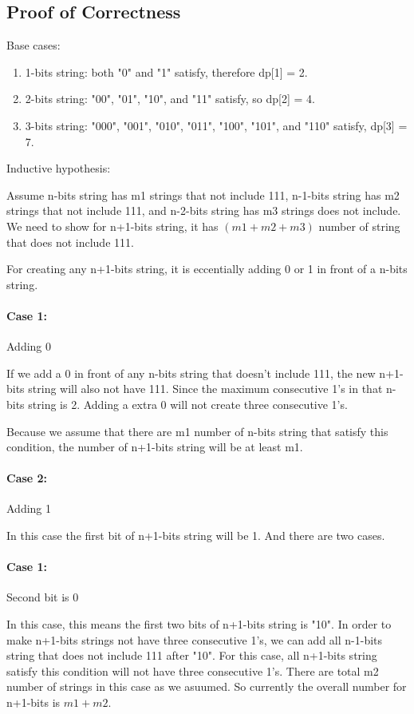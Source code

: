 \documentclass{article}
\begin{document}
\subsection*{Proof of Correctness}
Base cases:
\begin{enumerate}
    \item 1-bits string: both "0" and "1" satisfy, therefore dp[1] = 2.
    \item 2-bits string: "00", "01", "10", and "11" satisfy, so dp[2] = 4.
    \item 3-bits string: "000", "001", "010", "011", "100", "101", and "110" satisfy, dp[3] = 7.
\end{enumerate}
Inductive hypothesis:

Assume n-bits string has m1 strings that not include 111, n-1-bits string has m2 strings that not include 111, and n-2-bits string has m3 strings does not include.
We need to show for n+1-bits string, it has $(m1+m2+m3)$ number of string that does not include 111.

For creating any n+1-bits string, it is eccentially adding 0 or 1 in front of a n-bits string.
\paragraph*{Case 1:} Adding 0

If we add a 0 in front of any n-bits string that doesn't include 111, the new n+1-bits string will also not have 111.
Since the maximum consecutive 1's in that n-bits string is 2. Adding a extra 0 will not create three consecutive 1's.

Because we assume that there are m1 number of n-bits string that satisfy this condition, the number of n+1-bits string
will be at least m1.
\paragraph*{Case 2:} Adding 1

In this case the first bit of n+1-bits string will be 1. And there are two cases.
\paragraph*{Case 1:} Second bit is 0

In this case, this means the first two bits of n+1-bits string is "10". In order to make n+1-bits strings
not have three consecutive 1's, we can add all n-1-bits string that does not include 111 after "10". For this case,
all n+1-bits string satisfy this condition will not have three consecutive 1's. There are total m2 number of strings in this case
as we asuumed. So currently the overall number for n+1-bits is $m1+m2$.
\end{document}
